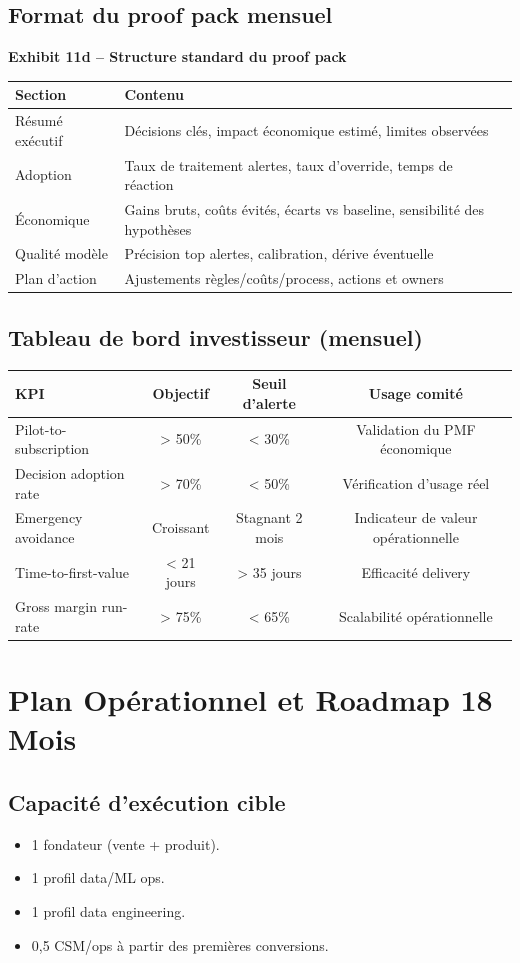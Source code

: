 \documentclass[11pt,a4paper]{article}
\newcommand{\exhibit}[1]{\vspace{2mm}\noindent\colorbox{PraedixaLight}{\parbox{\dimexpr\linewidth-2\fboxsep\relax}{\textbf{#1}}}\vspace{1mm}}
\begin{document}
\subsection{Format du proof pack mensuel}
\exhibit{Exhibit 11d -- Structure standard du proof pack}
\begin{tabularx}{\linewidth}{@{}l X@{}}
\toprule
\textbf{Section} & \textbf{Contenu} \\
\midrule
Résumé exécutif & Décisions clés, impact économique estimé, limites observées \\
Adoption & Taux de traitement alertes, taux d'override, temps de réaction \\
Économique & Gains bruts, coûts évités, écarts vs baseline, sensibilité des hypothèses \\
Qualité modèle & Précision top alertes, calibration, dérive éventuelle \\
Plan d'action & Ajustements règles/coûts/process, actions et owners \\
\bottomrule
\end{tabularx}

\subsection{Tableau de bord investisseur (mensuel)}
\begin{tabularx}{\linewidth}{@{}l c c c@{}}
\toprule
\textbf{KPI} & \textbf{Objectif} & \textbf{Seuil d'alerte} & \textbf{Usage comité} \\
\midrule
Pilot-to-subscription & > 50\% & < 30\% & Validation du PMF économique \\
Decision adoption rate & > 70\% & < 50\% & Vérification d'usage réel \\
Emergency avoidance & Croissant & Stagnant 2 mois & Indicateur de valeur opérationnelle \\
Time-to-first-value & < 21 jours & > 35 jours & Efficacité delivery \\
Gross margin run-rate & > 75\% & < 65\% & Scalabilité opérationnelle \\
\bottomrule
\end{tabularx}

\section{Plan Opérationnel et Roadmap 18 Mois}
\subsection{Capacité d'exécution cible}
\begin{itemize}
  \item 1 fondateur (vente + produit).
  \item 1 profil data/ML ops.
  \item 1 profil data engineering.
  \item 0,5 CSM/ops à partir des premières conversions.
\end{itemize}
\end{document}
